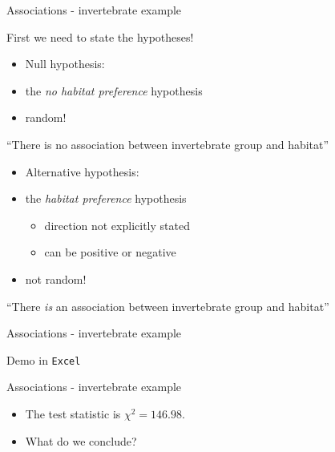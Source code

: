 \documentclass[
  ignorenonframetext,
  t]{beamer}
\providecommand{\tightlist}{%
  \setlength{\itemsep}{0pt}\setlength{\parskip}{0pt}}
\begin{document}
\begin{frame}{Associations - invertebrate example}
\protect\hypertarget{associations---invertebrate-example-4}{}

First we need to state the hypotheses!

\begin{itemize}
\tightlist
\item
  Null hypothesis:
\item
  the \emph{no habitat preference} hypothesis
\item
  random!
\end{itemize}

``There is no association between invertebrate group and habitat''

\vspace{0.25cm}

\begin{itemize}
\tightlist
\item
  Alternative hypothesis:
\item
  the \emph{habitat preference} hypothesis

  \begin{itemize}
  \tightlist
  \item
    direction not explicitly stated
  \item
    can be positive or negative
  \end{itemize}
\item
  not random!
\end{itemize}

``There \emph{is} an association between invertebrate group and
habitat''

\end{frame}

\begin{frame}{Associations - invertebrate example}
\protect\hypertarget{associations---invertebrate-example-5}{}

\vfill
\centering
\Large

Demo in \texttt{Excel}

\vfill

\end{frame}

\begin{frame}{Associations - invertebrate example}
\protect\hypertarget{associations---invertebrate-example-6}{}

\begin{itemize}
\tightlist
\item
  The test statistic is \(\chi^2 = 146.98\).
\item
  What do we conclude?
\end{itemize}

\end{frame}
\end{document}
